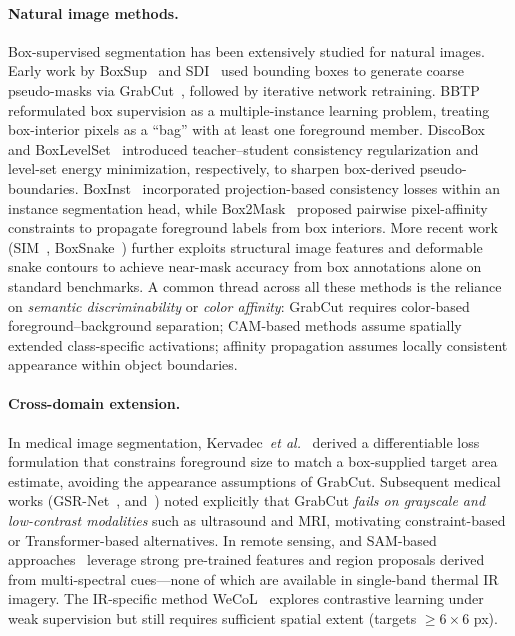 \paragraph{Natural image methods.}
Box-supervised segmentation has been extensively studied for natural images.
Early work by BoxSup~\cite{boxsup} and SDI~\cite{sdi} used bounding boxes to generate
coarse pseudo-masks via GrabCut~\cite{grabcut}, followed by iterative network retraining.
BBTP~\cite{bbtp} reformulated box supervision as a multiple-instance learning problem,
treating box-interior pixels as a ``bag'' with at least one foreground member.
DiscoBox~\cite{discobox} and BoxLevelSet~\cite{boxlevelset} introduced teacher--student
consistency regularization and level-set energy minimization, respectively, to sharpen
box-derived pseudo-boundaries.
BoxInst~\cite{boxinst} incorporated projection-based consistency losses within an instance
segmentation head, while Box2Mask~\cite{box2mask} proposed pairwise pixel-affinity
constraints to propagate foreground labels from box interiors.
More recent work (SIM~\cite{sim}, BoxSnake~\cite{boxsnake}) further exploits structural
image features and deformable snake contours to achieve near-mask accuracy from box
annotations alone on standard benchmarks.
A common thread across all these methods is the reliance on \emph{semantic discriminability}
or \emph{color affinity}: GrabCut requires color-based foreground--background separation;
CAM-based methods assume spatially extended class-specific activations; affinity
propagation assumes locally consistent appearance within object boundaries.

\paragraph{Cross-domain extension.}
In medical image segmentation, Kervadec~\emph{et al.}~\cite{kervadec2020weakly} derived
a differentiable loss formulation that constrains foreground size to match a box-supplied
target area estimate, avoiding the appearance assumptions of GrabCut.
Subsequent medical works (GSR-Net~\cite{gsrnet}, and~\cite{boxseg_miccai2022}) noted
explicitly that GrabCut \emph{fails on grayscale and low-contrast modalities} such as
ultrasound and MRI, motivating constraint-based or Transformer-based alternatives.
In remote sensing, \cite{boxseg_isprs2020} and SAM-based approaches~\cite{sam_rs2024}
leverage strong pre-trained features and region proposals derived from multi-spectral
cues---none of which are available in single-band thermal IR imagery.
The IR-specific method WeCoL~\cite{wecol} explores contrastive learning under weak
supervision but still requires sufficient spatial extent (targets $\geq$$6\times 6$ px).

